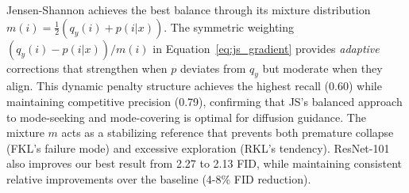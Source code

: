 \documentclass{article}
\begin{document}
Jensen-Shannon achieves the best balance through its mixture distribution $m(i) = \frac{1}{2}(q_y(i) + p(i|x))$. The symmetric weighting $(q_y(i) - p(i|x))/m(i)$ in Equation~\eqref{eq:js_gradient} provides \emph{adaptive} corrections that strengthen when $p$ deviates from $q_y$ but moderate when they align. This dynamic penalty structure achieves the highest recall (0.60) while maintaining competitive precision (0.79), confirming that JS's balanced approach to mode-seeking and mode-covering is optimal for diffusion guidance. The mixture $m$ acts as a stabilizing reference that prevents both premature collapse (FKL's failure mode) and excessive exploration (RKL's tendency).
ResNet-101 also improves our best result from 2.27 to 2.13 FID, while maintaining consistent relative improvements over the baseline (4-8\% FID reduction).
\end{document}
